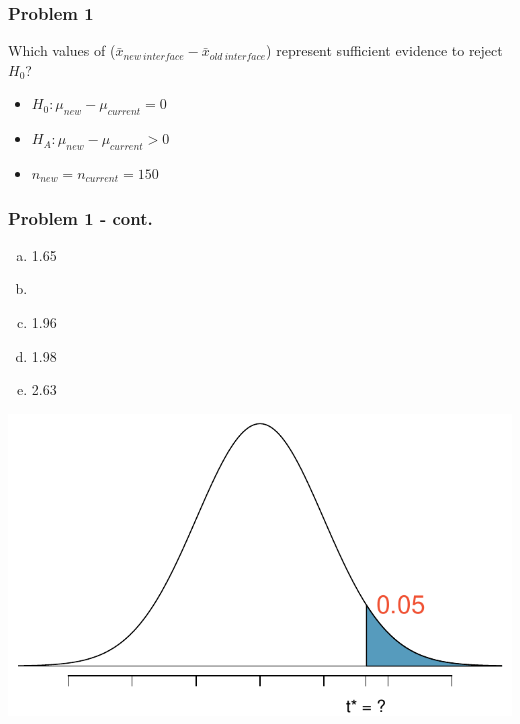 \documentclass[slidestop,compress,mathserif,12pt,t,professionalfonts,xcolor=table]{beamer}
\newcommand{\solnMult}[1]{
\only<1>{#1}
\only<2->{\red{\textbf{#1}}}
}
\begin{document}
\begin{frame}
\frametitle{Problem 1}

Which values of ($\bar{x}_{new~interface} - \bar{x}_{old~interface}$) represent sufficient 
evidence to reject $H_0$?

\begin{itemize}
\item[] $H_0: \mu_{new} - \mu_{current} = 0$
\item[] $H_A: \mu_{new} - \mu_{current} > 0$
\item[] $n_{new} = n_{current} = 150$
\end{itemize}

\end{frame}


\begin{frame}
\frametitle{Problem 1 - cont.}


{
\begin{enumerate}[(a)]
\item 1.65
\item \solnMult{1.66}
\item 1.96
\item 1.98
\item 2.63
\end{enumerate}
}
{
\includegraphics[width=\textwidth]{figures/med_hist_surveys/power_t_star_clicker.pdf}
}

\end{frame}
\end{document}
